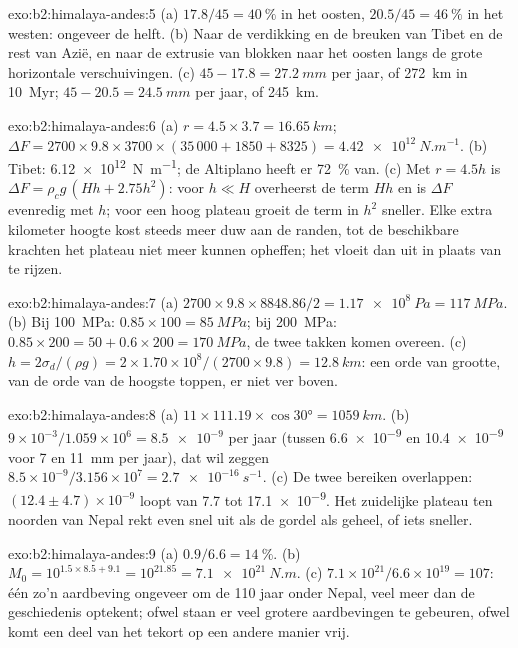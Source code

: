 \begin{solution}{exo:b2:himalaya-andes:5}
(a) $17.8/45 = \qty{40}{\percent}$ in het oosten, $20.5/45 = \qty{46}{\percent}$ in het westen:
ongeveer de helft. (b) Naar de verdikking en de breuken van Tibet en de rest van Azië, en naar
de extrusie van blokken naar het oosten langs de grote horizontale verschuivingen. (c) $45 - 17.8 =
\qty{27.2}{mm}$ per jaar, of \qty{272}{km} in \qty{10}{Myr}; $45 - 20.5 = \qty{24.5}{mm}$ per
jaar, of \qty{245}{km}.
\end{solution}

\begin{solution}{exo:b2:himalaya-andes:6}
(a) $r = 4.5\times3.7 = \qty{16.65}{km}$; $\Delta F = 2700\times9.8\times3700\times(35\,000 +
1850 + 8325) = \qty{4.42e12}{N.m^{-1}}$. (b) Tibet: \qty{6.12e12}{N.m^{-1}}; de Altiplano
heeft er \qty{72}{\percent} van. (c) Met $r = 4.5h$ is $\Delta F = \rho_c g\,(Hh + 2.75h^2)$: voor
$h \ll H$ overheerst de term $Hh$ en is $\Delta F$ evenredig met $h$; voor een hoog plateau
groeit de term in $h^2$ sneller. Elke extra kilometer hoogte kost steeds meer duw aan
de randen, tot de beschikbare krachten het plateau niet meer kunnen opheffen; het vloeit dan uit
in plaats van te rijzen.
\end{solution}

\begin{solution}{exo:b2:himalaya-andes:7}
(a) $2700\times9.8\times8848.86/2 = \qty{1.17e8}{Pa} = \qty{117}{MPa}$. (b) Bij
\qty{100}{MPa}: $0.85\times100 = \qty{85}{MPa}$; bij \qty{200}{MPa}: $0.85\times200 = 50 +
0.6\times200 = \qty{170}{MPa}$, de twee takken komen overeen. (c) $h = 2\sigma_d/(\rho g) =
2\times1.70\times10^8/(2700\times9.8) = \qty{12.8}{km}$: een orde van grootte, van de orde
van de hoogste toppen, er niet ver boven.
\end{solution}

\begin{solution}{exo:b2:himalaya-andes:8}
(a) $11\times111.19\times\cos\ang{30} = \qty{1059}{km}$. (b) $9\times10^{-3}/1.059\times10^{6}
= \num{8.5e-9}$ per jaar (tussen \num{6.6e-9} en \num{10.4e-9} voor 7 en \qty{11}{mm} per jaar),
dat wil zeggen $8.5\times10^{-9}/3.156\times10^{7} = \qty{2.7e-16}{s^{-1}}$. (c) De twee bereiken
overlappen: $(12.4 \pm 4.7) \times 10^{-9}$ loopt van 7.7 tot \num{17.1e-9}. Het zuidelijke plateau ten noorden van
Nepal rekt even snel uit als de gordel als geheel, of iets sneller.
\end{solution}

\begin{solution}{exo:b2:himalaya-andes:9}
(a) $0.9/6.6 = \qty{14}{\percent}$. (b) $M_0 = 10^{1.5\times8.5 + 9.1} = 10^{21.85} =
\qty{7.1e21}{N.m}$. (c) $7.1\times10^{21}/6.6\times10^{19} = 107$: één zo'n aardbeving ongeveer
om de 110 jaar onder Nepal, veel meer dan de geschiedenis optekent; ofwel staan er veel grotere aardbevingen
te gebeuren, ofwel komt een deel van het tekort op een andere manier vrij.
\end{solution}

